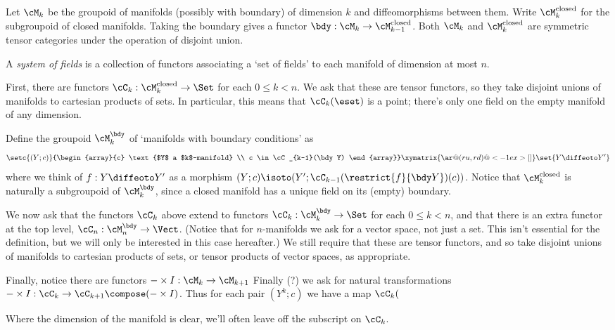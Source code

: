 \newcommand{\manifolds}[1]{\cM_{#1}}
\newcommand{\closedManifolds}[1]{\cM_{#1}^{\text{closed}}}
\newcommand{\boundaryConditions}[1]{\cM_{#1}^{\bdy}}
Let $\manifolds{k}$ be the groupoid of manifolds (possibly with boundary) of dimension $k$ and diffeomorphisms between them. Write
$\closedManifolds{k}$ for the subgroupoid of closed manifolds. Taking the boundary gives a functor $\bdy : \manifolds{k} \to \closedManifolds{k-1}$.
Both $\manifolds{k}$ and $\closedManifolds{k}$ are symmetric tensor categories under the operation of disjoint union.
\begin{defn}
A \emph{system of fields} is a collection of functors associating a `set of fields' to each manifold of dimension at most $n$.

First, there are functors $\cC_k : \closedManifolds{k} \to \Set$ for each $0 \leq k < n$. We ask that these are tensor functors, so they
take disjoint unions of manifolds to cartesian products of sets. In particular, this means that $\cC_k(\eset)$ is a point; there's only one field
on the empty manifold of any dimension.

Define the groupoid $\boundaryConditions{k}$ of `manifolds with boundary conditions' as
\begin{equation*}
\setc{(Y; c)}{\begin{array}{c} \text{$Y$ a $k$-manifold} \\  c \in \cC_{k-1}(\bdy Y) \end{array}}
\xymatrix{ \ar@(ru,rd)@<-1ex>[]}
\set{Y \diffeoto Y'}
\end{equation*}
where we think of $f: Y \diffeoto Y'$ as a morphism $(Y; c) \isoto (Y'; \cC_{k-1}(\restrict{f}{\bdy Y})(c))$.
%
Notice that $\closedManifolds{k}$ is naturally a subgroupoid of $\boundaryConditions{k}$, since a closed manifold has a unique field on its (empty) boundary.

We now ask that the functors $\cC_k$ above extend to functors $\cC_k : \boundaryConditions{k} \to \Set$ for  each $0 \leq k < n$,
and that there is an extra functor at the top level, $\cC_n : \boundaryConditions{n} \to \Vect$. (Notice that for $n$-manifolds we ask for a vector space, not just a set. This isn't essential for the definition, but we will only be interested in this case hereafter.)
We still require that these are tensor functors, and so take disjoint unions of manifolds to cartesian products of sets, or tensor products of vector spaces, as appropriate.

Finally, notice there are functors $- \times I : \manifolds{k} \to \manifolds{k+1}$
Finally (?) we ask for natural transformations $- \times I : \cC_k \to \cC_{k+1} \compose (- \times I)$. Thus for each pair $(Y^k; c)$ we have a map $\cC_k($
\end{defn}
\begin{rem}
Where the dimension of the manifold is clear, we'll often leave off the subscript on $\cC_k$.
\end{rem}

